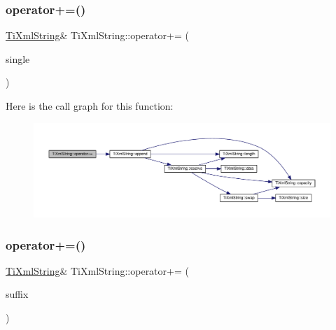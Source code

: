 \subsubsection{\texorpdfstring{operator+=()}{operator+=()}\hspace{0.1cm}{\footnotesize\ttfamily [2/3]}}
{\footnotesize\ttfamily \hyperlink{class_ti_xml_string}{Ti\+Xml\+String}\& Ti\+Xml\+String\+::operator+= (\begin{DoxyParamCaption}\item[{char}]{single }\end{DoxyParamCaption})\hspace{0.3cm}{\ttfamily [inline]}}

Here is the call graph for this function\+:\nopagebreak
\begin{figure}[H]
\begin{center}
\leavevmode
\includegraphics[width=350pt]{class_ti_xml_string_a6aa09d5240470b76d54ec709e04f8c13_cgraph}
\end{center}
\end{figure}
\mbox{\label{class_ti_xml_string_afdcae5ea2b4d9e194dc21226b817f417}} 
\subsubsection{\texorpdfstring{operator+=()}{operator+=()}\hspace{0.1cm}{\footnotesize\ttfamily [3/3]}}
{\footnotesize\ttfamily \hyperlink{class_ti_xml_string}{Ti\+Xml\+String}\& Ti\+Xml\+String\+::operator+= (\begin{DoxyParamCaption}\item[{const \hyperlink{class_ti_xml_string}{Ti\+Xml\+String} \&}]{suffix }\end{DoxyParamCaption})\hspace{0.3cm}{\ttfamily [inline]}}

